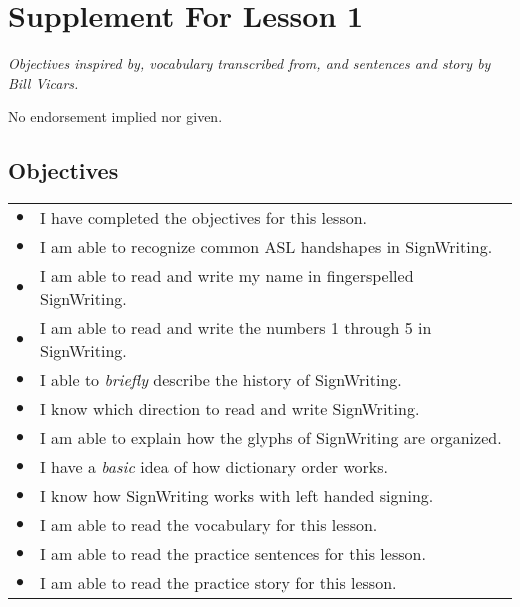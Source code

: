 \documentclass{article}
\begin{document}
\newfontfamily{}
\newfontfamily{}
\newcommand{\bul}{\hfil$\bullet$&}
\renewenvironment{glossary}{\begin{multicols}{5}\begin{center}}{\end{center}\end{multicols}}
\setcounter{secnumdepth}{0}
\setlength{\columnseprule}{1pt}

\section{Supplement For Lesson 1}

\begin{center}
\it
Objectives inspired by, vocabulary transcribed from, and sentences and story by Bill Vicars.

No endorsement implied nor given.
\end{center}

\subsection{Objectives}

\begin{tabular}{p{1cm}p{14cm}}
\bul I have completed the objectives for this lesson.\\
\bul I am able to recognize common ASL handshapes in SignWriting.\\
\bul I am able to read and write my name in fingerspelled SignWriting.\\
\bul I am able to read and write the numbers 1 through 5 in SignWriting.\\
\bul I able to \emph{briefly} describe the history of SignWriting.\\
\bul I know which direction to read and write SignWriting.\\
\bul I am able to explain how the glyphs of SignWriting are organized.\\
\bul I have a \emph{basic} idea of how dictionary order works.\\
\bul I know how SignWriting works with left handed signing.\\
\bul I am able to read the vocabulary for this lesson.\\
\bul I am able to read the practice sentences for this lesson.\\
\bul I am able to read the practice story for this lesson.\\
\end{tabular}
\end{document}
